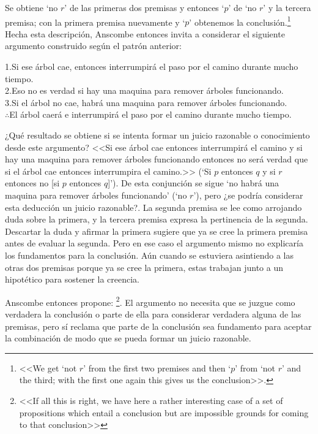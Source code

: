   Se obtiene `no $r$' de las primeras dos premisas y entonces `$p$' de `no $r$'
  y la tercera premisa; con la primera premisa nuevamente y `$p$' obtenemos la
  conclusión.{\footnote{\cite[299]{anscombe2015logic:qpa} <<We get `not $r$'
      from the first two premises and then `$p$' from `not $r$' and the third;
      with the first one again this gives us the conclusion>>.}} Hecha esta
  descripción, Anscombe entonces invita a considerar el siguiente argumento
  construido según el patrón anterior:
  \begin{adjustwidth}{1.2cm}{}
    1.\hspace{.5cm}Si ese árbol cae, entonces interrumpirá el paso por el camino
    durante mucho tiempo.\\
    2.\hspace{.5cm}Eso no es verdad si hay una maquina para remover árboles
    funcionando.\\
    3.\hspace{.5cm}Si el árbol no cae, habrá una maquina para remover árboles
    funcionando.\\
    $\therefore$\hspace{.5cm}El árbol caerá e interrumpirá el paso por el camino
    durante mucho tiempo.
  \end{adjustwidth}

  ¿Qué resultado se obtiene si se intenta formar un juicio razonable o
  conocimiento desde este argumento? <<Si ese árbol cae entonces interrumpirá el
  camino y si hay una maquina para remover árboles funcionando entonces no será
  verdad que si el árbol cae entonces interrumpira el camino.>> (`Si $p$
  entonces $q$ y si $r$ entonces no [si $p$ entonces $q$]'). De esta conjunción
  se sigue `no habrá una maquina para remover árboles funcionando' (`no $r$'),
  pero ¿se podría considerar esta deducción un juicio razonable?. La segunda
  premisa se lee como arrojando duda sobre la primera, y la tercera premisa
  expresa la pertinencia de la segunda. Descartar la duda y afirmar la primera
  sugiere que ya se cree la primera premisa antes de evaluar la segunda. Pero en
  ese caso el argumento mismo no explicaría los fundamentos para la conclusión.
  Aún cuando se estuviera asintiendo a las otras dos premisas porque ya se cree
  la primera, estas trabajan junto a un hipotético para sostener la
  creencia\autocite[Cf.~][300]{anscombe2015logic:qpa}.

  Anscombe entonces propone: \footnote{\cite[300]{anscombe2015logic:qpa} <<If all this is
    right, we have here a rather interesting case of a set of propositions which
    entail a conclusion but are impossible grounds for coming to that
    conclusion>>}. El argumento no necesita que se juzgue como verdadera la
  conclusión o parte de ella para considerar verdadera alguna de las premisas,
  pero sí reclama que parte de la conclusión sea fundamento para aceptar la
  combinación de modo que se pueda formar un juicio
  razonable\autocite[Cf.~][301]{anscombe2015logic:qpa}.


